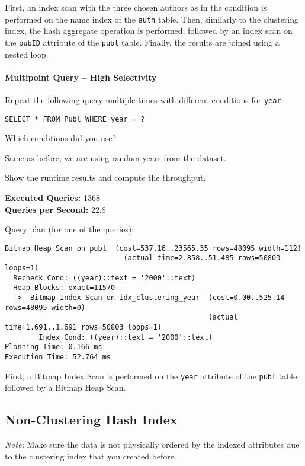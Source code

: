 \documentclass[11pt]{scrartcl}
\begin{document}
First, an index scan with the three chosen authors as in the condition is performed on the name index of the \texttt{auth}
table.
Then, similarly to the clustering index, the hash aggregate operation is performed, followed by an index scan on the
\texttt{pubID} attribute of the \texttt{publ} table.
Finally, the results are joined using a nested loop.

\paragraph{Multipoint Query -- High Selectivity}

Repeat the following query multiple times with different conditions for \texttt{year}.

\begin{lstlisting}[style=dbtsql]
SELECT * FROM Publ WHERE year = ?
\end{lstlisting}

Which conditions did you use?

Same as before, we are using random years from the dataset.

Show the runtime results and compute the throughput.

\textbf{Executed Queries: } 1368\\
\textbf{Queries per Second: } 22.8

Query plan (for one of the queries):

{\small
\parskip0pt\begin{verbatim}
Bitmap Heap Scan on publ  (cost=537.16..23565.35 rows=48095 width=112)
                            (actual time=2.858..51.485 rows=50803 loops=1)
  Recheck Cond: ((year)::text = '2000'::text)
  Heap Blocks: exact=11570
  ->  Bitmap Index Scan on idx_clustering_year  (cost=0.00..525.14 rows=48095 width=0)
                                                (actual time=1.691..1.691 rows=50803 loops=1)
        Index Cond: ((year)::text = '2000'::text)
Planning Time: 0.166 ms
Execution Time: 52.764 ms
\end{verbatim}}

First, a Bitmap Index Scan is performed on the \texttt{year} attribute of the \texttt{publ} table, followed by a Bitmap
Heap Scan.

\subsection*{Non-Clustering Hash Index}

\emph{Note:} Make sure the data is not physically ordered by the indexed attributes due to the clustering index that you created before.
\end{document}
